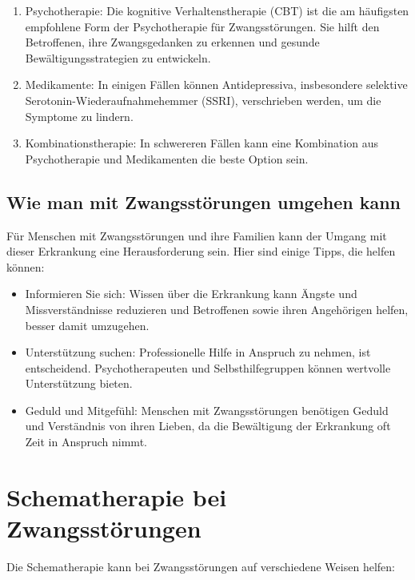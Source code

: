 \begin{enumerate}
  \item Psychotherapie: Die kognitive Verhaltenstherapie (CBT) ist die am häufigsten empfohlene Form der Psychotherapie für Zwangsstörungen. Sie hilft den Betroffenen, ihre Zwangsgedanken zu erkennen und gesunde Bewältigungsstrategien zu entwickeln.
  
  \item Medikamente: In einigen Fällen können Antidepressiva, insbesondere selektive Serotonin-Wiederaufnahmehemmer (SSRI), verschrieben werden, um die Symptome zu lindern.
  
  \item Kombinationstherapie: In schwereren Fällen kann eine Kombination aus Psychotherapie und Medikamenten die beste Option sein.
\end{enumerate}

\subsection{Wie man mit Zwangsstörungen umgehen kann}

Für Menschen mit Zwangsstörungen und ihre Familien kann der Umgang mit dieser Erkrankung eine Herausforderung sein. Hier sind einige Tipps, die helfen können:

\begin{itemize}
  \item Informieren Sie sich: Wissen über die Erkrankung kann Ängste und Missverständnisse reduzieren und Betroffenen sowie ihren Angehörigen helfen, besser damit umzugehen.
  
  \item Unterstützung suchen: Professionelle Hilfe in Anspruch zu nehmen, ist entscheidend. Psychotherapeuten und Selbsthilfegruppen können wertvolle Unterstützung bieten.
  
  \item Geduld und Mitgefühl: Menschen mit Zwangsstörungen benötigen Geduld und Verständnis von ihren Lieben, da die Bewältigung der Erkrankung oft Zeit in Anspruch nimmt.
\end{itemize}
\section{Schematherapie bei Zwangsstörungen}

Die Schematherapie kann bei Zwangsstörungen auf verschiedene Weisen helfen:

